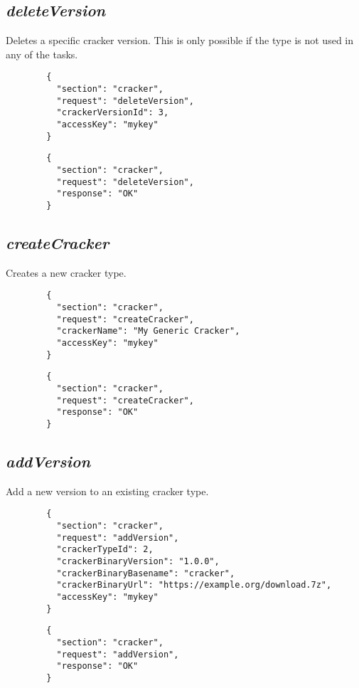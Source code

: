 \subsection*{\textit{deleteVersion}}
	Deletes a specific cracker version. This is only possible if the type is not used in any of the tasks.
	{
		\color{blue}
		\begin{verbatim}
		{
		  "section": "cracker",
		  "request": "deleteVersion",
		  "crackerVersionId": 3,
		  "accessKey": "mykey"
		}
		\end{verbatim}
	}
	{
		\color{OliveGreen}
		\begin{verbatim}
		{
		  "section": "cracker",
		  "request": "deleteVersion",
		  "response": "OK"
		}
		\end{verbatim}
	}
\subsection*{\textit{createCracker}}
	Creates a new cracker type.
	{
		\color{blue}
		\begin{verbatim}
		{
		  "section": "cracker",
		  "request": "createCracker",
		  "crackerName": "My Generic Cracker",
		  "accessKey": "mykey"
		}
		\end{verbatim}
	}
	{
		\color{OliveGreen}
		\begin{verbatim}
		{
		  "section": "cracker",
		  "request": "createCracker",
		  "response": "OK"
		}
		\end{verbatim}
	}
\subsection*{\textit{addVersion}}
	Add a new version to an existing cracker type.
	{
		\color{blue}
		\begin{verbatim}
		{
		  "section": "cracker",
		  "request": "addVersion",
		  "crackerTypeId": 2,
		  "crackerBinaryVersion": "1.0.0",
		  "crackerBinaryBasename": "cracker",
		  "crackerBinaryUrl": "https://example.org/download.7z",
		  "accessKey": "mykey"
		}
		\end{verbatim}
	}
	{
		\color{OliveGreen}
		\begin{verbatim}
		{
		  "section": "cracker",
		  "request": "addVersion",
		  "response": "OK"
		}
		\end{verbatim}
	}
